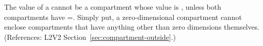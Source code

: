 The   value of a \Compartment cannot be a
compartment whose  value is ,
unless both compartments have =.
Simply put, a zero-dimensional compartment cannot enclose
compartments that have anything other than zero dimensions
themselves.  (References: L2V2
Section~\ref{sec:compartment-outside}.)
